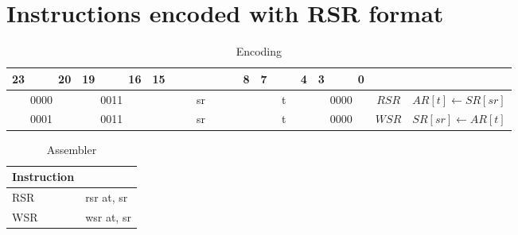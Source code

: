 \section{Instructions encoded with RSR format}
\begin{smalltables}
	\begin{longtable}{llllllllllllllllllllllll  p{1cm}  p{6cm} | }
		\caption{Encoding\label{long}}\\
		23 & & & 20 & 19 & & & 16 & 15 & & & & & & & 8 & 7 & & & 4 & 3 & & & 0 & & \multicolumn{1}{c}{}\\
		\hline
		\multicolumn{4}{|c|}{0000} & \multicolumn{4}{c|}{0011} & \multicolumn{8}{c|}{sr} & \multicolumn{4}{c|}{t} & \multicolumn{4}{c|}{0000} & \multicolumn{1}{c|}{$RSR$} & $AR[t] \leftarrow SR[sr]$ \\ \hline
		\multicolumn{4}{|c|}{0001} & \multicolumn{4}{c|}{0011} & \multicolumn{8}{c|}{sr} & \multicolumn{4}{c|}{t} & \multicolumn{4}{c|}{0000} & \multicolumn{1}{c|}{$WSR$} & $SR[sr] \leftarrow AR[t]$ \\ \hline
	\end{longtable}

	\begin{longtable}{|p{5cm}|p{5cm}|}
		\caption{Assembler\label{long}}\\
		\hline
		Instruction & \\
		\hline
		RSR & rsr at, sr\\ \hline
		WSR & wsr at, sr\\ \hline
	\end{longtable}
\end{smalltables}
